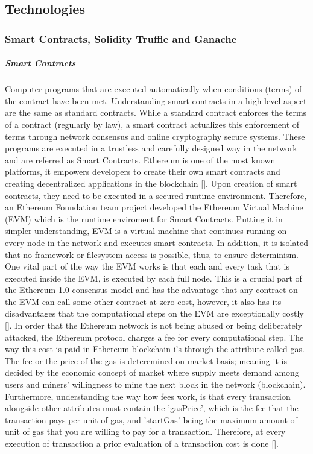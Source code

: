 \subsection{Technologies} \label{sssec:technologies}


\subsubsection{Smart Contracts, Solidity Truffle and Ganache}

\subparagraph{Smart Contracts} 
Computer programs that are executed automatically when conditions (terms) of the contract have been met. Understanding smart contracts in a high-level aspect are the same as standard contracts. While a standard contract enforces the terms of a contract (regularly by law), a smart contract actualizes this enforcement of terms through network consensus and online cryptography secure systems. These programs are executed in a trustless and carefully designed way in the network and are referred as Smart Contracts. Ethereum is one of the most known platforms, it empowers developers to create their own smart contracts and creating decentralized applications in the blockchain [\cite{Buterin2014}]. Upon creation of smart contracts, they need to be executed in a secured runtime environment. Therefore, an Ethereum Foundation team project developed the Ethereum Virtual Machine (EVM) which is the runtime enviroment for Smart Contracts. Putting it in simpler understanding, EVM is a virtual machine that continues running on every node in the network and executes smart contracts. In addition, it is isolated that no framework or filesystem access is possible, thus, to ensure determinism. One vital part of the way the EVM works is that each and every task that is executed inside the EVM, is executed by each full node. This is a crucial part of the Ethereum 1.0 consensus model and has the advantage that any contract on the EVM can call some other contract at zero cost, however, it also has its disadvantages that the computational steps on the EVM are exceptionally costly [\cite{Buterin2014}]. In order that the Ethereum network is not being abused or being deliberately attacked, the Ethereum protocol charges a fee for every computational step. The way this cost is paid in Ethereum blockchain i’s through the attribute called gas. The fee or the price of the gas is deteremined on market-basis; meaning it is decided by the economic concept of market where supply meets demand among users and miners' willingness to mine the next block in the network (blockchain). Furthermore, understanding the way how fees work, is that every transaction alongside other attributes must contain the 'gasPrice', which is the fee that the transaction pays per unit of gas, and 'startGas' being the maximum amount of unit of gas that you are willing to pay for a transaction. Therefore, at every execution of transaction a prior evaluation of a transaction cost is done [\cite{Buterin2014}].
